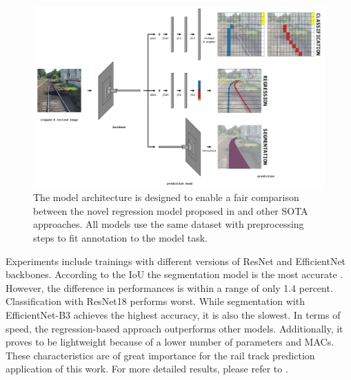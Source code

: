 \begin{figure}[H]
    \centering
    \includegraphics[width=\linewidth]{PICs/Baselinepaper/tep-net_sota_models.jpg}
    \caption{The model architecture is designed to enable a fair comparison between the novel regression model proposed in \cite{tepNet2024} and other \ac{SOTA} approaches.
    All models use the same dataset with preprocessing steps to fit annotation to the model task.}
    \label{fig:TEP-Net_sota_models}
\end{figure}

Experiments include trainings with different versions of ResNet and EfficientNet backbones.
According to the \ac{IoU} the segmentation model is the most accurate \cite{tepNet2024}.
However, the difference in performances is within a range of only 1.4 percent.
Classification with ResNet18 performs worst.
While segmentation with EfficientNet-B3 achieves the highest accuracy, it is also the slowest.
In terms of speed, the regression-based approach outperforms other models.
Additionally, it proves to be lightweight because of a lower number of parameters and \ac{MACs}.
These characteristics are of great importance for the rail track prediction application of this work.
For more detailed results, please refer to \cite{tepNet2024}.

